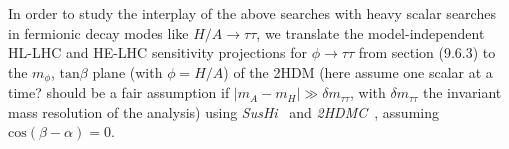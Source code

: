 In order to study the interplay of the above searches with heavy scalar searches in fermionic decay modes like $H/A \to \tau\tau$, 
we translate the model-independent HL-LHC and HE-LHC sensitivity projections for $\phi \to \tau\tau$ from section (9.6.3) 
to the $m_{\phi}$, $\mathrm{tan}\beta$ plane (with $\phi = H/A$) of the 2HDM (here assume one scalar at a time? should be a fair assumption if 
$|m_A - m_H| \gg \delta m_{\tau\tau}$, with $\delta m_{\tau\tau}$ the invariant mass resolution of the analysis)
using {\sl SusHi}~\cite{Harlander:2012pb} and {\sl 2HDMC}~\cite{Eriksson:2009ws}, assuming 
$\mathrm{cos}(\beta - \alpha) = 0$.
